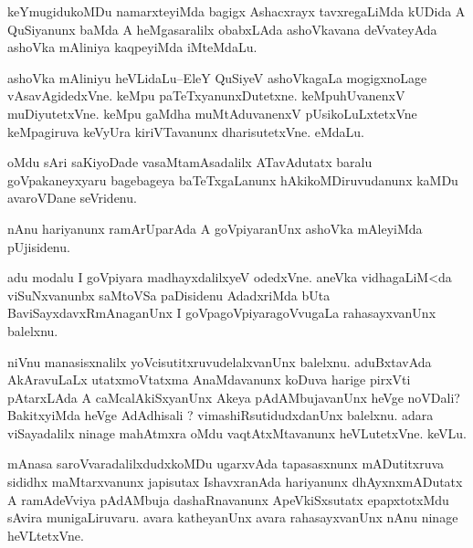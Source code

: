 \documentclass{article}
\begin{document}
\begin{mn}%
keYmugidukoMDu namarxteyiMda bagigx Ashacxrayx tavxregaLiMda kUDida A QuSiyanunx baMda A 
heMgasaralilx obabxLAda ashoVkavana deVvateyAda ashoVka mAliniya kaqpeyiMda iMteMdaLu.
\end{mn}

\begin{mn}%
ashoVka mAliniyu heVLidaLu--EleY QuSiyeV ashoVkagaLa mogigxnoLage vAsavAgidedxVne. keMpu 
paTeTxyanunxDutetxne. keMpuhUvanenxV muDiyutetxVne. keMpu gaMdha muMtAduvanenxV 
pUsikoLuLxtetxVne keMpagiruva keVyUra kiriVTavanunx dharisutetxVne. eMdaLu.
\end{mn}

\begin{mn}%
oMdu sAri saKiyoDade vasaMtamAsadalilx ATavAdutatx baralu goVpakaneyxyaru bagebageya 
baTeTxgaLanunx hAkikoMDiruvudanunx kaMDu avaroVDane seVridenu.
\end{mn}

\begin{mn}%
nAnu hariyanunx ramArUparAda A goVpiyaranUnx ashoVka mAleyiMda pUjisidenu.
\end{mn}

\begin{mn}%
adu modalu I goVpiyara madhayxdalilxyeV odedxVne. aneVka vidhagaLiM<da viSuNxvanunbx 
saMtoVSa paDisidenu AdadxriMda bUta BaviSayxdavxRmAnaganUnx I goVpagoVpiyaragoVvugaLa 
rahasayxvanUnx balelxnu.
\end{mn}

\begin{mn}%
niVnu manasisxnalilx yoVcisutitxruvudelalxvanUnx balelxnu. aduBxtavAda AkAravuLaLx 
utatxmoVtatxma AnaMdavanunx koDuva harige pirxVti pAtarxLAda A caMcalAkiSxyanUnx Akeya 
pAdAMbujavanUnx heVge noVDali? BakitxyiMda heVge AdAdhisali ? vimashiRsutidudxdanUnx 
balelxnu. adara viSayadalilx ninage mahAtmxra oMdu vaqtAtxMtavanunx heVLutetxVne. keVLu.
\end{mn}

\begin{mn}%
mAnasa saroVvaradalilxdudxkoMDu ugarxvAda tapasasxnunx mADutitxruva sididhx maMtarxvanunx 
japisutax IshavxranAda hariyanunx dhAyxnxmADutatx A ramAdeVviya pAdAMbuja dashaRnavanunx 
ApeVkiSxsutatx epapxtotxMdu sAvira munigaLiruvaru. avara katheyanUnx avara rahasayxvanUnx 
nAnu ninage heVLtetxVne.
\end{mn}

\end{document}
